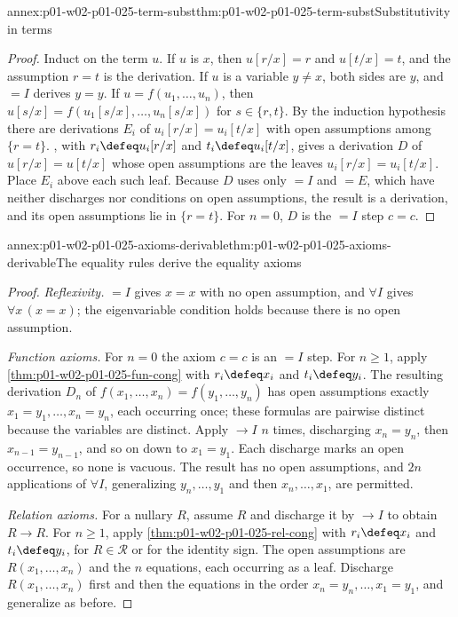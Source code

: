 \begin{annexitem}{annex:p01-w02-p01-025-term-subst}{thm:p01-w02-p01-025-term-subst}{Substitutivity in terms}
\begin{proof}
Induct on the term \(u\).  If \(u\) is \(x\), then \(u[r/x]=r\) and
\(u[t/x]=t\), and the assumption \(r=t\) is the derivation.  If \(u\) is a
variable \(y\ne x\), both sides are \(y\), and \(=I\) derives \(y=y\).  If
\(u=f(u_1,\ldots,u_n)\), then \(u[s/x]=f(u_1[s/x],\ldots,u_n[s/x])\) for
\(s\in\{r,t\}\).  By the induction hypothesis there are derivations
\(E_i\) of \(u_i[r/x]=u_i[t/x]\) with open assumptions among \(\{r=t\}\).
, with \(r_i\defeq u_i[r/x]\) and
\(t_i\defeq u_i[t/x]\), gives a derivation \(D\) of \(u[r/x]=u[t/x]\) whose
open assumptions are the leaves \(u_i[r/x]=u_i[t/x]\).  Place \(E_i\) above
each such leaf.  Because \(D\) uses only \(=I\) and \(=E\), which have
neither discharges nor conditions on open assumptions, the result is a
derivation, and its open assumptions lie in \(\{r=t\}\).  For \(n=0\), \(D\)
is the \(=I\) step \(c=c\).
\end{proof}
\end{annexitem}

\begin{annexitem}{annex:p01-w02-p01-025-axioms-derivable}{thm:p01-w02-p01-025-axioms-derivable}{The equality rules derive the equality axioms}
\begin{proof}
\emph{Reflexivity.}  \(=I\) gives \(x=x\) with no open assumption, and
\(\forall I\) gives \(\forall x\,(x=x)\); the eigenvariable condition holds
because there is no open assumption.

\emph{Function axioms.}  For \(n=0\) the axiom \(c=c\) is an \(=I\) step.
For \(n\geq 1\), apply \cref{thm:p01-w02-p01-025-fun-cong} with
\(r_i\defeq x_i\) and \(t_i\defeq y_i\).  The resulting derivation \(D_n\)
of \(f(x_1,\ldots,x_n)=f(y_1,\ldots,y_n)\) has open assumptions exactly
\(x_1=y_1,\ldots,x_n=y_n\), each occurring once; these formulas are pairwise
distinct because the variables are distinct.  Apply \(\to I\) \(n\) times,
discharging \(x_n=y_n\), then \(x_{n-1}=y_{n-1}\), and so on down to
\(x_1=y_1\).  Each discharge marks an open occurrence, so none is vacuous.
The result has no open assumptions, and \(2n\) applications of \(\forall I\),
generalizing \(y_n,\ldots,y_1\) and then \(x_n,\ldots,x_1\), are permitted.

\emph{Relation axioms.}  For a nullary \(R\), assume \(R\) and discharge it by
\(\to I\) to obtain \(R\to R\).  For \(n\geq 1\), apply
\cref{thm:p01-w02-p01-025-rel-cong} with \(r_i\defeq x_i\) and
\(t_i\defeq y_i\), for \(R\in\mathcal R\) or for the identity sign.  The open
assumptions are \(R(x_1,\ldots,x_n)\) and the \(n\) equations, each
occurring as a leaf.  Discharge \(R(x_1,\ldots,x_n)\) first and then the
equations in the order \(x_n=y_n,\ldots,x_1=y_1\), and generalize as before.
\end{proof}
\end{annexitem}

